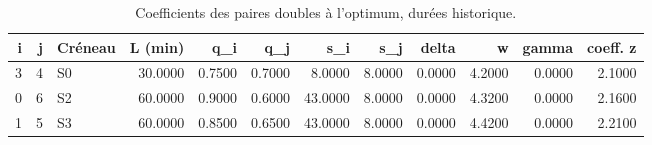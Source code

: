 \begin{table}[htbp]
\caption{Coefficients des paires doubles à l'optimum, durées historique.}
\label{tab:pairs-historique}
\begin{tabular}{rrlrrrrrrrrr}
\toprule
i & j & Créneau & L (min) & q\_i & q\_j & s\_i & s\_j & delta & w & gamma & coeff. z \\
\midrule
3 & 4 & S0 & 30.0000 & 0.7500 & 0.7000 & 8.0000 & 8.0000 & 0.0000 & 4.2000 & 0.0000 & 2.1000 \\
0 & 6 & S2 & 60.0000 & 0.9000 & 0.6000 & 43.0000 & 8.0000 & 0.0000 & 4.3200 & 0.0000 & 2.1600 \\
1 & 5 & S3 & 60.0000 & 0.8500 & 0.6500 & 43.0000 & 8.0000 & 0.0000 & 4.4200 & 0.0000 & 2.2100 \\
\bottomrule
\end{tabular}
\end{table}

